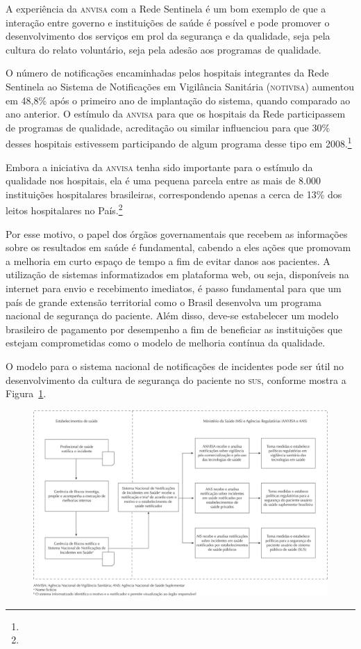 \documentclass{article}
\begin{document}
A experiência da \textsc{anvisa} com a Rede Sentinela é um bom exemplo de que a interação
entre
governo e instituições de saúde é possível e pode promover o desenvolvimento dos
serviços em
prol da segurança e da qualidade, seja pela cultura do relato voluntário, seja
pela adesão
aos programas de qualidade.

O número de notificações encaminhadas pelos hospitais integrantes da Rede
Sentinela ao
Sistema de Notificações em Vigilância Sanitária (\textsc{notivisa}) aumentou em 48,8\%
após o primeiro
ano de implantação do sistema, quando comparado ao ano anterior. O estímulo da
\textsc{anvisa} para
que os hospitais da Rede participassem de programas de qualidade, acreditação ou
similar
influenciou para que 30\% desses hospitais estivessem participando de algum
programa desse
tipo em 2008.\footnote{}

Embora a iniciativa da \textsc{anvisa} tenha sido importante para o estímulo da qualidade
nos
hospitais, ela é uma pequena parcela entre as mais de 8.000 instituições
hospitalares
brasileiras, correspondendo apenas a cerca de 13\% dos leitos hospitalares no
País.\footnote{}

Por esse motivo, o papel dos órgãos governamentais que recebem as informações
sobre os
resultados em saúde é fundamental, cabendo a eles ações que promovam a melhoria
em curto
espaço de tempo a fim de evitar danos aos pacientes. A utilização de sistemas
informatizados
em plataforma web, ou seja, disponíveis na internet para envio e recebimento
imediatos, é
passo fundamental para que um país de grande extensão territorial como o Brasil
desenvolva
um programa nacional de segurança do paciente. Além disso, deve-se estabelecer
um modelo
brasileiro de pagamento por desempenho a fim de beneficiar as instituições que
estejam
comprometidas como o modelo de melhoria contínua da qualidade.

O modelo para o sistema nacional de notificações de incidentes pode ser útil no
desenvolvimento da cultura de segurança do paciente no \textsc{sus}, conforme mostra a
Figura~\ref{fig:f01}.

\begin{figure}
\includegraphics[width=\textwidth]{0034-8910-rsp-47-04-0791-gf01.jpg}
\caption{}\label{fig:f01}
\end{figure}
\end{document}
